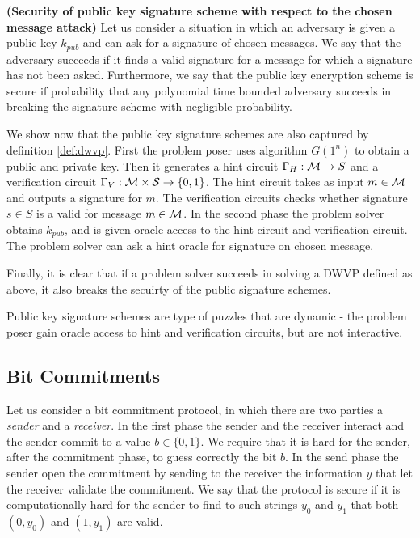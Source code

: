 \documentclass[11pt,a4paper,titlepage]{memoir}
\begin{document}

\begin{definition}\textbf{(Security of public key signature scheme with respect to the chosen message attack)}
Let us consider a situation in which an adversary is given a public key $k_{pub}$ and can ask for a signature of chosen messages.
We say that the adversary succeeds if it finds a valid signature for a message for which a signature has not been asked.
Furthermore, we say that the public key encryption scheme is secure if probability that any polynomial time bounded adversary
succeeds in breaking the signature scheme with negligible probability.
\end{definition}

We show now that the public key signature schemes are also captured by definition \ref{def:dwvp}.
First the problem poser uses algorithm $G(1^n)$ to obtain a public and private key.
Then it generates a hint circuit $\Gamma_H : \mathcal{M} \rightarrow S$ and a verification circuit $\Gamma_V : \mathcal{M} \times \mathcal{S} \rightarrow \{0,1\}$.
The hint circuit takes as input $m \in \mathcal{M}$ and outputs a signature for $m$. The verification circuits checks whether
signature $s \in S$ is a valid for message $m \in \mathcal{M}$.
In the second phase the problem solver obtains $k_{pub}$, and is given oracle access to the hint circuit and verification circuit.
The problem solver can ask a hint oracle for signature on chosen message.

Finally, it is clear that if a problem solver succeeds in solving a DWVP defined as above, it also breaks the secuirty of the public signature schemes.

Public key signature schemes are type of puzzles that are dynamic - the problem poser gain oracle access to hint and verification circuits,
but are not interactive.

\subsection{Bit Commitments}
\cite{LectureNotesComThCrypto}
Let us consider a bit commitment protocol, in which there are two parties a \textit{sender} and a \textit{receiver}.
In the first phase the sender and the receiver interact and the sender commit to a value $b \in \{0,1\}$.
We require that it is hard for the sender, after the commitment phase, to guess correctly the bit $b$.
In the send phase the sender open the commitment by sending to the receiver the information $y$ that let
the receiver validate the commitment.
We say that the protocol is secure if it is computationally hard for the sender to find to such strings $y_0$ and $y_1$
that both $(0, y_0)$ and $(1, y_1)$ are valid.
\end{document}
